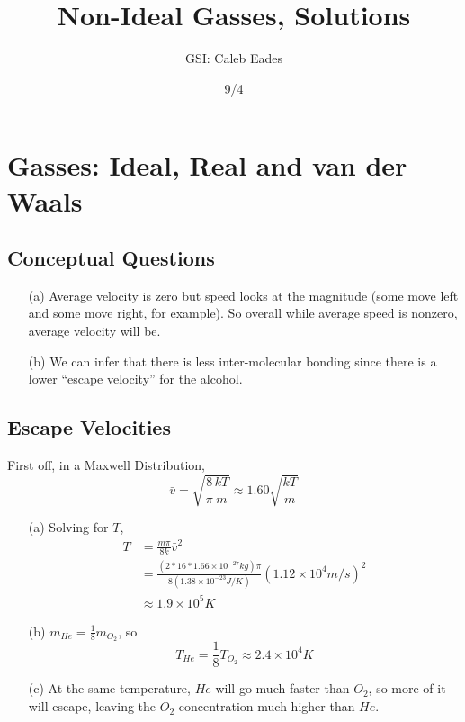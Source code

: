 \documentclass{article}
\begin{document}
	
\title{Non-Ideal Gasses, Solutions}
\author{GSI: Caleb Eades}
\date{9/4}
\maketitle

\section{Gasses: Ideal, Real and van der Waals}

\subsection{Conceptual Questions}

\begin{itemize}
	\item[(a)] Average velocity is zero but speed looks at the magnitude (some move left and some move right, for example). So overall while average speed is nonzero, average velocity will be.
	\item[(b)] We can infer that there is less inter-molecular bonding since there is a lower ``escape velocity'' for the alcohol.
\end{itemize}

\subsection{Escape Velocities}

First off, in a Maxwell Distribution,
\begin{equation}
\bar{v}=\sqrt{\frac{8}{\pi}\frac{kT}{m}} \approx 1.60\sqrt{\frac{kT}{m}}
\end{equation}
\begin{itemize}
	\item[(a)] Solving for $T$,
	\begin{align*}
	T &= \frac{m\pi}{8k}\bar{v}^2 \\
	&= \frac{(2*16*1.66\times10^{-27} kg)\pi}{8(1.38\times10^{-23} J/K)}(1.12\times 10^4 m/s)^2 \\
	&\approx 1.9\times10^5 K
	\end{align*}
	\item[(b)] $m_{He} = \frac{1}{8}m_{O_2}$, so
	\begin{equation}
	T_{He} = \frac{1}{8}T_{O_2}\approx2.4\times10^4 K
	\end{equation}
	\item[(c)] At the same temperature, $He$ will go much faster than $O_2$, so more of it will escape, leaving the $O_2$ concentration much higher than $He$.
\end{itemize}
\end{document}
